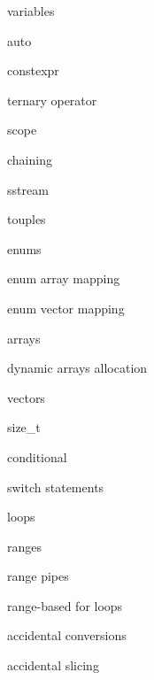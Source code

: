         variables

        auto
        
        constexpr 
        
         ternary operator
        
         scope
        
         chaining
        
         sstream 

         touples

         enums

         enum array mapping

         enum vector mapping

         arrays

         dynamic arrays allocation

         vectors

         size_t 

         conditional

         switch statements

         loops

         ranges

         range pipes

         range-based for loops

         accidental conversions
        
         accidental slicing 
        
